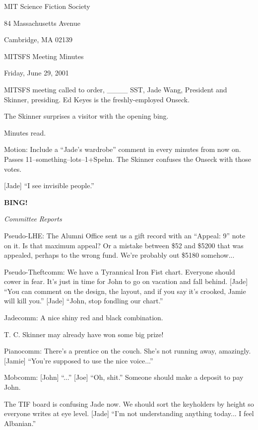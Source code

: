 \documentclass[12pt]{article}
\newcommand{\bing}{{\bf BING!} }
\newcommand{\goto}[1]{\bing \vskip 12pt \centerline{{\em{#1}}}}
\begin{document}
\begin{center}

MIT Science Fiction Society 

84 Massachusetts Avenue

Cambridge, MA 02139

\vspace{12pt}

MITSFS Meeting Minutes 

Friday, June 29, 2001

\end{center}
 
\vspace{18pt}

\setlength{\parskip}{6pt}

\noindent
MITSFS meeting called to order, \_\_\_\_ SST, Jade Wang, President and
Skinner, presiding.  Ed Keyes is the freshly-employed Onseck.

The Skinner surprises a visitor with the opening bing.

Minutes read.

Motion: Include a ``Jade's wardrobe'' comment in every minutes from
now on.  Passes 11--something--lots--1+Spehn.  The Skinner confuses
the Onseck with those votes.

[Jade] ``I see invisible people.''

\goto{Committee Reports}

Pseudo-LHE: The Alumni Office sent us a gift record with an ``Appeal: 9''
note on it.  Is that maximum appeal?  Or a mistake between \$52 and \$5200
that was appealed, perhaps to the wrong fund.  We're probably out \$5180
somehow...

Pseudo-Theftcomm: We have a Tyrannical Iron Fist chart.  Everyone should
cower in fear.  It's just in time for John to go on vacation and fall
behind.  [Jade] ``You can comment on the design, the layout, and if you
say it's crooked, Jamie will kill you.''  [Jade] ``John, stop fondling
our chart.''

Jadecomm: A nice shiny red and black combination.

T. C. Skinner may already have won some big prize!

Pianocomm: There's a prentice on the couch.  She's not running away,
amazingly.  [Jamie] ``You're supposed to use the nice voice...''

Mobcomm: [John] ``...''  [Joe] ``Oh, shit.''  Someone should make a deposit
to pay John.

The TIF board is confusing Jade now.  We should sort the keyholders by
height so everyone writes at eye level.  [Jade] ``I'm not understanding
anything today... I feel Albanian.''
\end{document}
